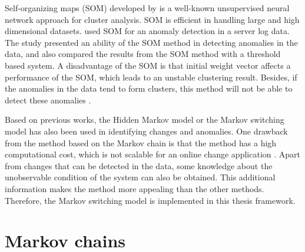 Self-organizing maps (SOM) developed by \citet{kohonen1982self} is
a well-known unsupervised neural network approach for cluster analysis.
SOM is efficient in handling large and high dimensional datasets.
\citet{nousiainen2009anomaly} used SOM for an anomaly detection in
a server log data. The study presented an ability of the SOM method
in detecting anomalies in the data, and also compared the results
from the SOM method with a threshold based system. A disadvantage
of the SOM is that initial weight vector affects a performance of
the SOM, which leads to an unstable clustering result. Besides, if
the anomalies in the data tend to form clusters, this method will
not be able to detect these anomalies \citep{chandola2009anomaly}. 

Based on previous works, the Hidden Markov model or the Markov switching
model has also been used in identifying changes and anomalies. One
drawback from the method based on the Markov chain is that the method
has a high computational cost, which is not scalable for an online
change application \citep{patcha2007overview}. Apart from changes
that can be detected in the data, some knowledge about the unobservable
condition of the system can also be obtained. This additional information
makes the method more appealing than the other methods. Therefore,
the Markov switching model is implemented in this thesis framework.

\section{Markov chains\label{sec:Markov-chains}}

